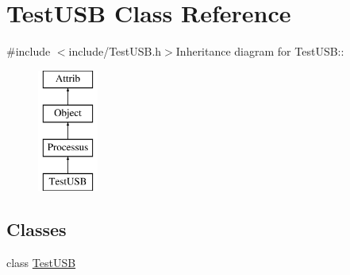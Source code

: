 \hypertarget{classTestUSB}{
\section{TestUSB Class Reference}
\label{classTestUSB}
}


{\ttfamily \#include $<$include/TestUSB.h$>$}Inheritance diagram for TestUSB::\begin{figure}[H]
\begin{center}
\leavevmode
\includegraphics[height=4cm]{classTestUSB}
\end{center}
\end{figure}
\subsection*{Classes}
\begin{DoxyCompactItemize}
\item 
class \hyperlink{classTestUSB_1_1TestUSB}{TestUSB}
\end{DoxyCompactItemize}
